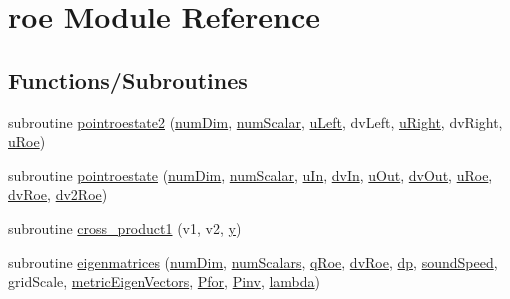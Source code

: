 \hypertarget{namespaceroe}{}\section{roe Module Reference}
\label{namespaceroe}
\subsection*{Functions/\+Subroutines}
\begin{DoxyCompactItemize}
\item 
subroutine \hyperlink{namespaceroe_aa40cd6c8eebd973a90987a77c8efa884}{pointroestate2} (\hyperlink{SATKernels_8H_a680185db8546de161968dabace9e94f1}{num\+Dim}, \hyperlink{SATKernels_8H_ac97409f480a745850ce5b215aabef12a}{num\+Scalar}, \hyperlink{RoeKernels_8H_a6d30a232f8df207a0a3655c728f0c396}{u\+Left}, dv\+Left, \hyperlink{RoeKernels_8H_ad7596a27f3010967e23b245f06eadfdd}{u\+Right}, dv\+Right, \hyperlink{RoeKernels_8H_a5624e61551b02c502a36c52d56b2350b}{u\+Roe})
\item 
subroutine \hyperlink{namespaceroe_a98a581399f474ceddad29a35b54824b7}{pointroestate} (\hyperlink{SATKernels_8H_a680185db8546de161968dabace9e94f1}{num\+Dim}, \hyperlink{SATKernels_8H_ac97409f480a745850ce5b215aabef12a}{num\+Scalar}, \hyperlink{RoeKernels_8H_a1b97e89ad96c3195da39163d30857767}{u\+In}, \hyperlink{RoeKernels_8H_a24a50bb7f3155b1d6314eec79d33d669}{dv\+In}, \hyperlink{RoeKernels_8H_aa8ba2167c968e6f2da632acd106b7f88}{u\+Out}, \hyperlink{RoeKernels_8H_ac5fd034bc232848163b16d30e790e8b1}{dv\+Out}, \hyperlink{RoeKernels_8H_a5624e61551b02c502a36c52d56b2350b}{u\+Roe}, \hyperlink{RoeKernels_8H_a642571b2454da1bb84221249e107f82a}{dv\+Roe}, \hyperlink{RoeKernels_8H_a21369091011c3e247805004394055b28}{dv2\+Roe})
\item 
subroutine \hyperlink{namespaceroe_abdb2a52cc70419994c076b8f904a3450}{cross\+\_\+product1} (v1, v2, \hyperlink{SimpleKernels_8H_adbbc84da22c830df0837e7f82eff48d8}{y})
\item 
subroutine \hyperlink{namespaceroe_acb3b55f2bf22c43e91196d4915f7fecb}{eigenmatrices} (\hyperlink{SATKernels_8H_a680185db8546de161968dabace9e94f1}{num\+Dim}, \hyperlink{WENOKernels_8H_a653618c9ce0046e8ef3b30321ea41f98}{num\+Scalars}, \hyperlink{RoeKernels_8H_a1d673d40f8fa40c8e56ed0d69021e9dc}{q\+Roe}, \hyperlink{RoeKernels_8H_a642571b2454da1bb84221249e107f82a}{dv\+Roe}, \hyperlink{RoeKernels_8H_ac12401cc24ddbf8b003a0e6201826e90}{dp}, \hyperlink{RoeKernels_8H_ab66f723f3c3d8399c4428802a1142be0}{sound\+Speed}, grid\+Scale, \hyperlink{RoeKernels_8H_abc719b26d5e9b9d4a4f40ad4261c5f70}{metric\+Eigen\+Vectors}, \hyperlink{RoeKernels_8H_a15dafdc1823a1c1281057d840bfdcda6}{Pfor}, \hyperlink{RoeKernels_8H_a399ec13188834ab2fbeb1b2e02def95d}{Pinv}, \hyperlink{RoeKernels_8H_a89211c91f7e80725e4791ef58e043244}{lambda})

\end{DoxyCompactItemize}
